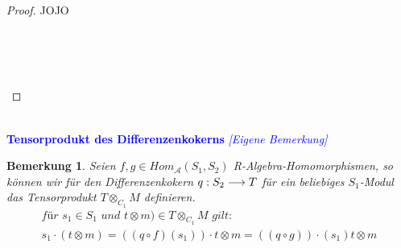 \documentclass[10pt,a4paper]{report}
\newcommand{\comment}[1]{}
\newcounter{Aussage}[chapter]
\newtheorem{bem}[Aussage]{Bemerkung}
\newcommand{\functionfront}[3]{\nolinebreak{#1:#2 \longrightarrow #3}}
\newcommand{\Tensor}[3]{#1 \otimes_{#2} #3}
\newcommand{\tensor}[3]{#1 \otimes #3}
\begin{document}
\begin{proof}
JOJO
\begin{center}
\ \\
\ \\
\ \\
\end{center}
\end{proof}


\ \\
\textcolor{blue}{\textbf{Tensorprodukt des Differenzenkokerns} \textit{[Eigene Bemerkung]}}
\begin{bem} \comment{\label{Tensorprodukt des Differenzenkokerns}}
Seien $f,g \in Hom_{\mathcal{A}}(S_1,S_2)$ R-Algebra-Homomorphismen, so können wir für den Differenzenkokern $\functionfront{q}{S_2}{T}$ für ein beliebiges $S_1$-Modul das Tensorprodukt $\Tensor{T}{C_1}{M}$ definieren. 
\begin{gather*}
\textit{für } s_1 \in S_1 \textit{ und } \tensor{t}{S_1}{m}) \in \Tensor{T}{C_1}{M} \textit{ gilt: }\\
s_1 \cdot (\tensor{t}{S_1}{m}) = \tensor{((q \circ f)(s_1)) \cdot t}{S_1}{m} = \tensor{((q \circ g)) \cdot (s_1)t}{S_1}{m}
\end{gather*}
\end{bem}
\end{document}
